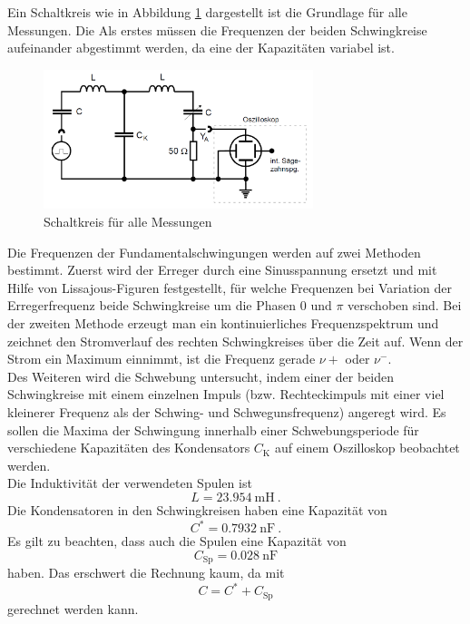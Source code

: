Ein Schaltkreis wie in Abbildung \ref{fig:Abb6} dargestellt ist die Grundlage für alle Messungen. Die Als erstes müssen die Frequenzen der beiden Schwingkreise aufeinander abgestimmt werden, da eine der Kapazitäten variabel ist. \\
\begin{figure}[h!]
	\centering
	\includegraphics[width=0.7\textwidth]{Abb6.png}
	\caption{Schaltkreis für alle Messungen}
	\label{fig:Abb6}
\end{figure}
Die Frequenzen der Fundamentalschwingungen werden auf zwei Methoden bestimmt. Zuerst wird der Erreger durch eine Sinusspannung ersetzt und mit Hilfe von Lissajous-Figuren festgestellt, für welche Frequenzen bei Variation der Erregerfrequenz beide Schwingkreise um die Phasen 0 und $\pi$ verschoben sind. Bei der zweiten Methode erzeugt man ein kontinuierliches Frequenzspektrum und zeichnet den Stromverlauf des rechten Schwingkreises über die Zeit auf. Wenn der Strom ein Maximum einnimmt, ist die Frequenz gerade $\nu+$ oder $\nu^-$. \\
Des Weiteren wird die Schwebung untersucht, indem einer der beiden Schwingkreise mit einem einzelnen Impuls (bzw. Rechteckimpuls mit einer viel kleinerer Frequenz als der Schwing- und Schwegunsfrequenz) angeregt wird. Es sollen die Maxima der Schwingung innerhalb einer Schwebungsperiode für verschiedene Kapazitäten des Kondensators $C_\text{K}$ auf einem Oszilloskop beobachtet werden. \\
\clearpage
Die Induktivität der verwendeten Spulen ist
\[ L = \SI{23.954}{\milli\henry} \ . \]
Die Kondensatoren in den Schwingkreisen haben eine Kapazität von
\[ C^* = \SI{0.7932}{\nano\farad} \ . \]
Es gilt zu beachten, dass auch die Spulen eine Kapazität von
\[ C_\text{Sp} = \SI{0.028}{\nano\farad} \]
haben. Das erschwert die Rechnung kaum, da mit
\[ C = C^* + C_\text{Sp} \]
gerechnet werden kann. \\